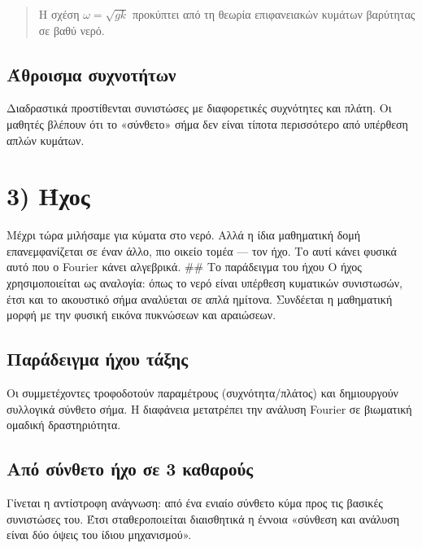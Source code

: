 \documentclass[
  a4paper,
  11pt,
]{article}
\begin{document}
\begin{quote}
Η σχέση \(\omega = \sqrt{gk}\) προκύπτει από τη θεωρία επιφανειακών
κυμάτων βαρύτητας σε βαθύ νερό.
\end{quote}

\subsection{Άθροισμα
συχνοτήτων}\label{ux3acux3b8ux3c1ux3bfux3b9ux3c3ux3bcux3b1-ux3c3ux3c5ux3c7ux3bdux3bfux3c4ux3aeux3c4ux3c9ux3bd}

Διαδραστικά προστίθενται συνιστώσες με διαφορετικές συχνότητες και
πλάτη. Οι μαθητές βλέπουν ότι το «σύνθετο» σήμα δεν είναι τίποτα
περισσότερο από υπέρθεση απλών κυμάτων.

\section{3) Ήχος}\label{ux3aeux3c7ux3bfux3c2}

Μέχρι τώρα μιλήσαμε για κύματα στο νερό. Αλλά η ίδια μαθηματική δομή
επανεμφανίζεται σε έναν άλλο, πιο οικείο τομέα --- τον ήχο. Το αυτί
κάνει φυσικά αυτό που ο Fourier κάνει αλγεβρικά. \#\# Το παράδειγμα του
ήχου Ο ήχος χρησιμοποιείται ως αναλογία: όπως το νερό είναι υπέρθεση
κυματικών συνιστωσών, έτσι και το ακουστικό σήμα αναλύεται σε απλά
ημίτονα. Συνδέεται η μαθηματική μορφή με την φυσική εικόνα πυκνώσεων και
αραιώσεων.

\subsection{Παράδειγμα ήχου
τάξης}\label{ux3c0ux3b1ux3c1ux3acux3b4ux3b5ux3b9ux3b3ux3bcux3b1-ux3aeux3c7ux3bfux3c5-ux3c4ux3acux3beux3b7ux3c2}

Οι συμμετέχοντες τροφοδοτούν παραμέτρους (συχνότητα/πλάτος) και
δημιουργούν συλλογικά σύνθετο σήμα. Η διαφάνεια μετατρέπει την ανάλυση
Fourier σε βιωματική ομαδική δραστηριότητα.

\subsection{Από σύνθετο ήχο σε 3
καθαρούς}\label{ux3b1ux3c0ux3cc-ux3c3ux3cdux3bdux3b8ux3b5ux3c4ux3bf-ux3aeux3c7ux3bf-ux3c3ux3b5-3-ux3baux3b1ux3b8ux3b1ux3c1ux3bfux3cdux3c2}

Γίνεται η αντίστροφη ανάγνωση: από ένα ενιαίο σύνθετο κύμα προς τις
βασικές συνιστώσες του. Έτσι σταθεροποιείται διαισθητικά η έννοια
«σύνθεση και ανάλυση είναι δύο όψεις του ίδιου μηχανισμού».
\end{document}
